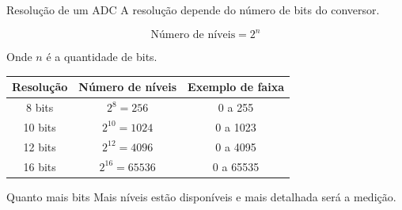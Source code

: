 \begin{frame}{Resolução de um ADC}
    A resolução depende do número de bits do conversor.

    \[
        \text{Número de níveis} = 2^n
    \]

    Onde $n$ é a quantidade de bits.

    \vspace{0.3cm}

    \begin{table}
        \centering
        \begin{tabular}{ccc}
            \toprule
            Resolução & Número de níveis & Exemplo de faixa \\
            \midrule
            8 bits  & $2^8 = 256$ & 0 a 255 \\
            10 bits & $2^{10} = 1024$ & 0 a 1023 \\
            12 bits & $2^{12} = 4096$ & 0 a 4095 \\
            16 bits & $2^{16} = 65536$ & 0 a 65535 \\
            \bottomrule
        \end{tabular}
    \end{table}

    \begin{alertblock}{Quanto mais bits}
        Mais níveis estão disponíveis e mais detalhada será a medição.
    \end{alertblock}
\end{frame}
